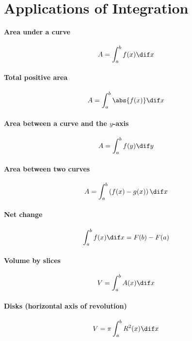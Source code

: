 \section{Applications of Integration}
\paragraph{Area under a curve}
	\begin{equation}
		A = \int_a^b f(x) \dif x
	\end{equation}
\paragraph{Total positive area}
	\begin{equation}
		A = \int_a^b \abs{f(x)} \dif x
	\end{equation}
\paragraph{Area between a curve and the $y$-axis}
	\begin{equation}
		A = \int_a^b f(y) \dif y
	\end{equation}
\paragraph{Area between two curves}
	\begin{equation}
		A = \int_a^b \left( f(x) - g(x) \right) \dif x
	\end{equation}
\paragraph{Net change}
	\begin{equation}
		\int_a^b f(x) \dif x = F(b) - F(a)
	\end{equation}
\paragraph{Volume by slices}
	\begin{equation}
		V = \int_a^b A(x) \dif x
	\end{equation}
\paragraph{Disks (horizontal axis of revolution)}
	\begin{equation}
		V  = \pi \int_a^b R^2(x) \dif x
	\end{equation}
